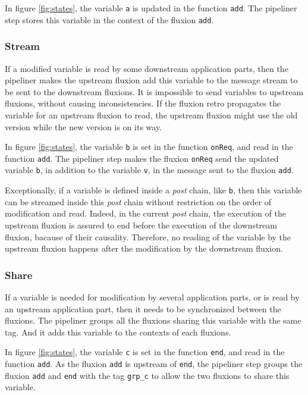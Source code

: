 In figure \ref{fig:states}, the variable \texttt{a} is updated in the function \texttt{add}.
The pipeliner step stores this variable in the context of the fluxion \texttt{add}.

\subsubsection{Stream}
If a modified variable is read by some downstream application parts, then the pipeliner makes the upstream fluxion add this variable to the message stream to be sent to the downstream fluxions.
It is impossible to send variables to upstream flux\-ions, without causing inconsistencies.
If the fluxion retro propagates the variable for an upstream fluxion to read, the upstream fluxion might use the old version while the new version is on its way.

In figure \ref{fig:states}, the variable \texttt{b} is set in the function \texttt{onReq}, and read in the function \texttt{add}.
The pipeliner step makes the fluxion \texttt{onReq} send the updated variable \texttt{b}, in addition to the variable \texttt{v}, in the message sent to the fluxion \texttt{add}.

Exceptionally, if a variable is defined inside a \textit{post} chain, like \texttt{b}, then this variable can be streamed inside this \textit{post} chain without restriction on the order of modification and read.
Indeed, in the current \textit{post} chain, the execution of the upstream fluxion is assured to end before the execution of the downstream fluxion, bacause of their causality.
Therefore, no reading of the variable by the upstream fluxion happens after the modification by the downstream fluxion.

\subsubsection{Share}
If a variable is needed for modification by several application parts, or is read by an upstream application part, then it needs to be synchronized between the fluxions.
The pipeliner groups all the fluxions sharing this variable with the same tag.
And it adds this variable to the contexts of each fluxions.

In figure \ref{fig:states}, the variable \texttt{c} is set in the function \texttt{end}, and read in the function \texttt{add}.
As the fluxion \texttt{add} is upstream of \texttt{end}, the pipeliner step groups the fluxion \texttt{add} and \texttt{end} with the tag \texttt{grp\_c} to allow the two fluxions to share this variable.